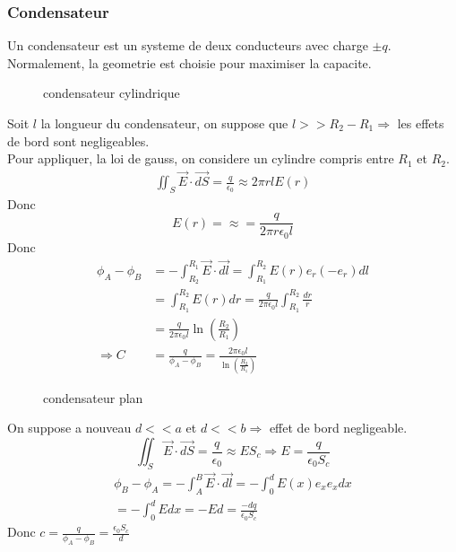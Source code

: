 \documentclass[../main.tex]{subfiles}
\begin{document}
\subsubsection{Condensateur}
Un condensateur est un systeme de deux conducteurs avec charge $\pm q$.\\
Normalement, la geometrie est choisie pour maximiser la capacite.
\begin{figure}[H]
    \centering
    \caption{condensateur cylindrique}
    \label{fig:condensateur-cylindrique}
\end{figure}
Soit $l$ la longueur du condensateur, on suppose que $l>>R_2-R_1 \Rightarrow $ les effets de bord sont negligeables.\\
Pour appliquer, la loi de gauss, on considere un cylindre compris entre $R_1$ et $R_2$.
\begin{align*}
	\iint_S \vec{E}\cdot \vec{dS}= \frac{q}{\epsilon_0} \approx 2\pi r l E( r) 
\end{align*}
Donc
\[ 
	E( r) = \approx = \frac{q}{2\pi r\epsilon_0 l}
\]
Donc
\begin{align*}
	\phi_A- \phi_B &= - \int_{ R_2 }^{ R_1 }\vec{E}\cdot \vec{dl} = \int_{ R_1 }^{ R_2 } E( r) e_r ( - e_r) dl\\
		       &= \int_{ R_1 }^{ R_2 } E( r) dr = \frac{q}{2\pi \epsilon_0 l} \int_{ R_1 }^{ R_2 } \frac{dr}{r}	\\
		       &= \frac{q}{2 \pi \epsilon_0 l}\ln (  \frac{R_2}{R_1}) 	\\
	\Rightarrow  C &= \frac{q}{\phi_A-\phi_B}= \frac{2\pi \epsilon_0 l}{ \ln ( \frac{R_2}{R_1}) }
\end{align*}
\begin{figure}[H]
    \centering
    \caption{condensateur plan}
    \label{fig:condensateur-plan}
\end{figure}
On suppose a nouveau $d<<a$ et $d<<b \Rightarrow $ effet de bord negligeable.
\[ 
\iint_S \vec{E}\cdot \vec{dS} = \frac{q}{\epsilon_0}\approx E S_c \Rightarrow  E = \frac{q}{\epsilon_0 S_c}
\]
\begin{align*}
	\phi_B - \phi_A = - \int_{ A }^{ B } \vec{E}\cdot \vec{dl} = - \int_{ 0 }^{ d }E( x) e_x e_x dx\\
	= - \int_{ 0 }^{ d }E dx = - Ed = \frac{- dq}{\epsilon_0 S_c}
\end{align*}
Donc $c= \frac{q}{\phi_A- \phi_B}= \frac{\epsilon_0S_c}{d}$
\end{document}
